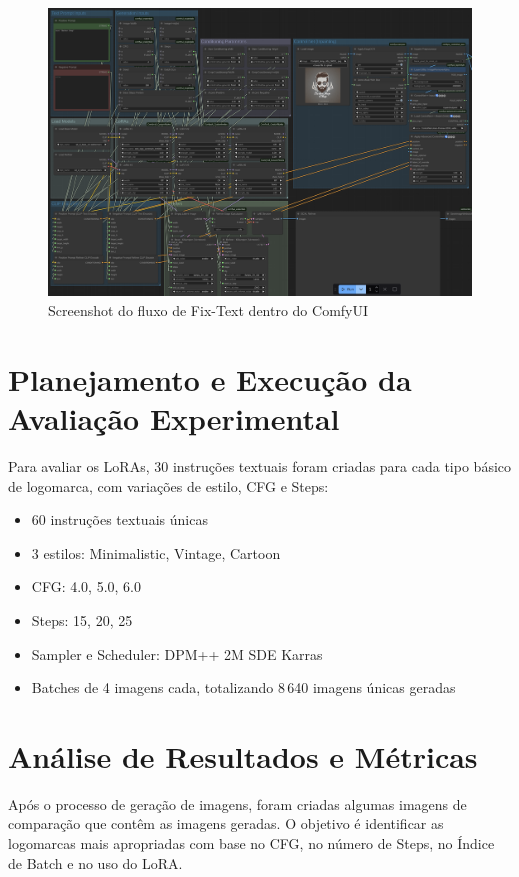 \documentclass[12pt, %
openright, 
oneside, %
a4paper,    %
brazil]{facom-ufu-abntex2}
\begin{document}
\begin{figure}[H]
    \centering
	\includegraphics[width=\linewidth]{figuras/fix-text-flow.png}
	\caption[Fluxo Fix-Text (ComfyUI)]{Screenshot do fluxo de Fix-Text dentro do ComfyUI}
	\label{fig:fixTextFlow}
\end{figure}

\section{Planejamento e Execução da Avaliação Experimental}

Para avaliar os LoRAs, 30 instruções textuais foram criadas para cada tipo básico de logomarca, com variações de estilo, CFG e Steps:

\begin{itemize}
    \item 60 instruções textuais únicas
    \item 3 estilos: Minimalistic, Vintage, Cartoon
    \item CFG: 4.0, 5.0, 6.0
    \item Steps: 15, 20, 25
    \item Sampler e Scheduler: DPM++ 2M SDE Karras
    \item Batches de 4 imagens cada, totalizando 8\,640 imagens únicas geradas
\end{itemize}

\section{Análise de Resultados e Métricas}

Após o processo de geração de imagens, foram criadas algumas imagens de comparação que contêm as imagens geradas. O objetivo é identificar as logomarcas mais apropriadas com base no CFG, no número de Steps, no Índice de Batch e no uso do LoRA.
\end{document}
